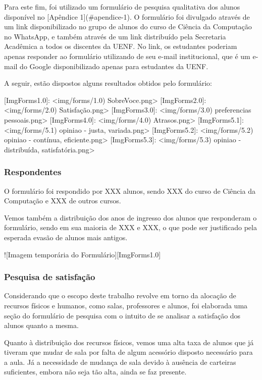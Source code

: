 Para este fim, foi utilizado um formulário de pesquisa qualitativa dos alunos disponível no [Apêndice 1](#apendice-1). O formulário foi divulgado através de um link disponibilizado no grupo de alunos do curso de Ciência da Computação no WhatsApp, e também através de um link distribuído pela Secretaria Acadêmica a todos os discentes da UENF. No link, os estudantes poderiam apenas responder ao formulário utilizando de seu e-mail institucional, que é um e-mail do Google disponibilizado apenas para estudantes da UENF.

A seguir, estão dispostos alguns resultados obtidos pelo formulário:

[ImgForms1.0]: <img/forms/1.0) SobreVoce.png>
[ImgForms2.0]: <img/forms/2.0) Satisfação.png>
[ImgForms3.0]: <img/forms/3.0) preferencias pessoais.png>
[ImgForms4.0]: <img/forms/4.0) Atrasos.png>
[ImgForms5.1]: <img/forms/5.1) opiniao - justa, variada.png>
[ImgForms5.2]: <img/forms/5.2) opiniao - contínua, eficiente.png>
[ImgForms5.3]: <img/forms/5.3) opiniao - distribuída, satisfatória.png>

\subsubsection{Respondentes} %

O formulário foi respondido por XXX alunos, sendo XXX do curso de Ciência da Computação e XXX de outros cursos.

Vemos também a distribuição dos anos de ingresso dos alunos que responderam o formulário, sendo em sua maioria de XXX e XXX, o que pode ser justificado pela esperada evasão de alunos mais antigos.

![Imagem temporária do Formulário][ImgForms1.0]

\subsubsection{Pesquisa de satisfação} %

Considerando que o escopo deste trabalho revolve em torno da alocação de recursos físicos e humanos, como salas, professores e alunos, foi elaborada uma seção do formulário de pesquisa com o intuito de se analisar a satisfação dos alunos quanto a mesma.

Quanto à distribuição dos recursos físicos, vemos uma alta taxa de alunos que já tiveram que mudar de sala por falta de algum acessório disposto necessário para a aula. Já a necessidade de mudança de sala devido à ausência de carteiras suficientes, embora não seja tão alta, ainda se faz presente.

